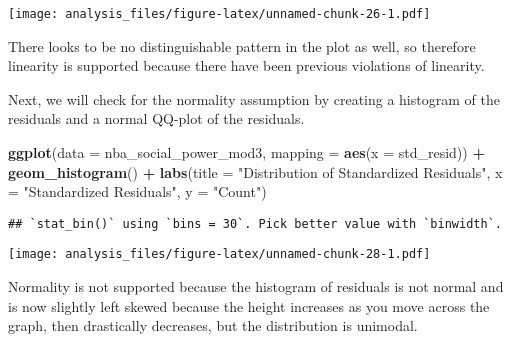\documentclass[]{article}
\newenvironment{Shaded}{\begin{snugshade}}{\end{snugshade}}
\newcommand{\DataTypeTok}[1]{\textcolor[rgb]{0.13,0.29,0.53}{#1}}
\newcommand{\KeywordTok}[1]{\textcolor[rgb]{0.13,0.29,0.53}{\textbf{#1}}}
\newcommand{\NormalTok}[1]{#1}
\newcommand{\OperatorTok}[1]{\textcolor[rgb]{0.81,0.36,0.00}{\textbf{#1}}}
\newcommand{\StringTok}[1]{\textcolor[rgb]{0.31,0.60,0.02}{#1}}
\begin{document}
\texttt{[image: analysis\_files/figure-latex/unnamed-chunk-26-1.pdf]}

There looks to be no distinguishable pattern in the plot as well, so
therefore linearity is supported because there have been previous
violations of linearity.

Next, we will check for the normality assumption by creating a histogram
of the residuals and a normal QQ-plot of the residuals.

\begin{Shaded}
\end{Shaded}

\begin{Shaded}
\begin{Highlighting}[]
\KeywordTok{ggplot}\NormalTok{(}\DataTypeTok{data =}\NormalTok{ nba_social_power_mod3, }\DataTypeTok{mapping =} \KeywordTok{aes}\NormalTok{(}\DataTypeTok{x =}\NormalTok{ std_resid)) }\OperatorTok{+}\StringTok{ }\KeywordTok{geom_histogram}\NormalTok{() }\OperatorTok{+}\StringTok{ }\KeywordTok{labs}\NormalTok{(}\DataTypeTok{title =} \StringTok{"Distribution of Standardized Residuals"}\NormalTok{,}
                                                                                         \DataTypeTok{x =} \StringTok{"Standardized Residuals"}\NormalTok{,}
                                                                                         \DataTypeTok{y =} \StringTok{"Count"}\NormalTok{)}
\end{Highlighting}
\end{Shaded}

\begin{verbatim}
## `stat_bin()` using `bins = 30`. Pick better value with `binwidth`.
\end{verbatim}

\texttt{[image: analysis\_files/figure-latex/unnamed-chunk-28-1.pdf]}

Normality is not supported because the histogram of residuals is not
normal and is now slightly left skewed because the height increases as
you move across the graph, then drastically decreases, but the
distribution is unimodal.
\end{document}
